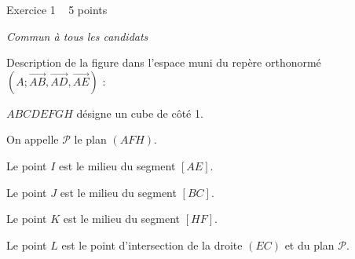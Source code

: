 
%
\begin{h2}Exercice 1   5 points\end{h2}
\textit{Commun à tous les candidats}
\par
Description de la figure dans l'espace muni du repère orthonormé  $\left(A ;  \overrightarrow{AB}, \overrightarrow{AD}, \overrightarrow{AE}\right)$  :
\par
$ABCDEFGH$ désigne un cube de côté 1.
\par
On appelle $\mathscr P$ le plan $\left(AFH\right)$.
\par
Le point $I$ est le milieu du segment $\left[AE\right]$.
\par
Le point $J$ est le milieu du segment $\left[BC\right]$.
\par
Le point $K$ est le milieu du segment $\left[HF\right]$.
\par
Le point $L$ est le point d'intersection de la droite $\left(EC\right)$ et du plan $\mathscr P$.

\begin{center}
\end{center}

